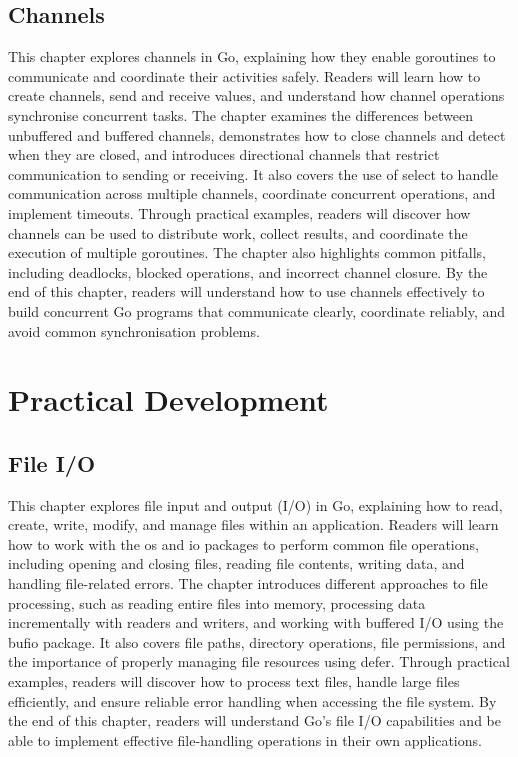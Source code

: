 \documentclass[12pt,oneside]{book}
\begin{document}
\chapter{Channels}
\begin{chaptersummary}
This chapter explores channels in Go, explaining how they enable goroutines to communicate and coordinate their activities safely. Readers will learn how to create channels, send and receive values, and understand how channel operations synchronise concurrent tasks. The chapter examines the differences between unbuffered and buffered channels, demonstrates how to close channels and detect when they are closed, and introduces directional channels that restrict communication to sending or receiving. It also covers the use of select to handle communication across multiple channels, coordinate concurrent operations, and implement timeouts. Through practical examples, readers will discover how channels can be used to distribute work, collect results, and coordinate the execution of multiple goroutines. The chapter also highlights common pitfalls, including deadlocks, blocked operations, and incorrect channel closure. By the end of this chapter, readers will understand how to use channels effectively to build concurrent Go programs that communicate clearly, coordinate reliably, and avoid common synchronisation problems.
\end{chaptersummary}


\part{Practical Development}

\chapter{File I/O}
\begin{chaptersummary}
This chapter explores file input and output (I/O) in Go, explaining how to read, create, write, modify, and manage files within an application. Readers will learn how to work with the os and io packages to perform common file operations, including opening and closing files, reading file contents, writing data, and handling file-related errors. The chapter introduces different approaches to file processing, such as reading entire files into memory, processing data incrementally with readers and writers, and working with buffered I/O using the bufio package. It also covers file paths, directory operations, file permissions, and the importance of properly managing file resources using defer. Through practical examples, readers will discover how to process text files, handle large files efficiently, and ensure reliable error handling when accessing the file system. By the end of this chapter, readers will understand Go’s file I/O capabilities and be able to implement effective file-handling operations in their own applications.
\end{chaptersummary}

\end{document}
